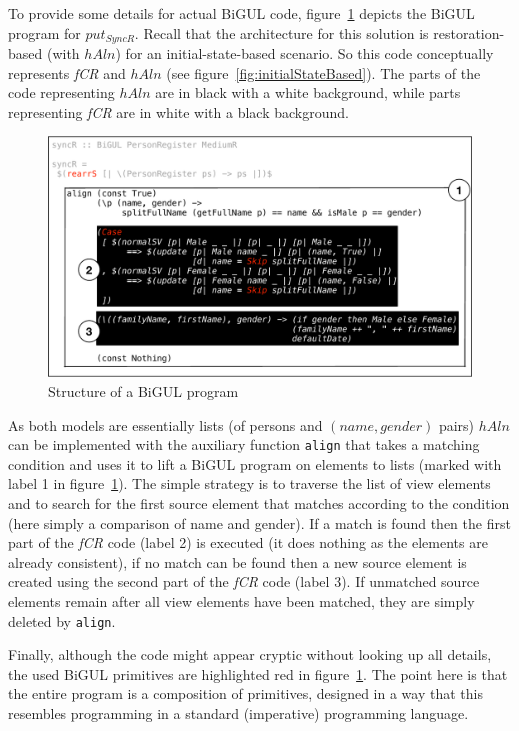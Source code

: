 To provide some details for actual BiGUL code, figure~\ref{fig:bigulSolnDetails} depicts the BiGUL program for $put_{SyncR}$.
Recall that the architecture for this solution is restoration-based (with $hAln$) for an initial-state-based scenario.
So this code conceptually represents \emph{fCR} and $hAln$ (see figure~\ref{fig:initialStateBased}).
The parts of the code representing $hAln$ are in black with a white background, while parts representing \emph{fCR} are in white with a black background.

\begin{figure}[tbp]
    \centering
    \includegraphics[width=\columnwidth]{diagrams/solutions/bigulSolnDetails}
    \caption{Structure of a BiGUL program}
    \label{fig:bigulSolnDetails}
\end{figure}

As both models are essentially lists (of persons and $(name, gender)$ pairs) $hAln$ can be implemented with the auxiliary function \texttt{align} that takes a matching condition and uses it to lift a BiGUL program on elements to lists (marked with label 1 in figure~\ref{fig:bigulSolnDetails}).
The simple strategy is to traverse the list of view elements and to search for the first source element that matches according to the condition (here simply a comparison of name and gender).
If a match is found then the first part of the \emph{fCR} code (label 2) is executed (it does nothing as the elements are already consistent), if no match can be found then a new source element is created using the second part of the \emph{fCR} code (label 3).
If unmatched source elements remain after all view elements have been matched, they are simply deleted by \texttt{align}.

Finally, although the code might appear cryptic without looking up all details, the used BiGUL primitives are highlighted red in figure~\ref{fig:bigulSolnDetails}.
The point here is that the entire program is a composition of primitives, designed in a way that this resembles programming in a standard (imperative) programming language.
